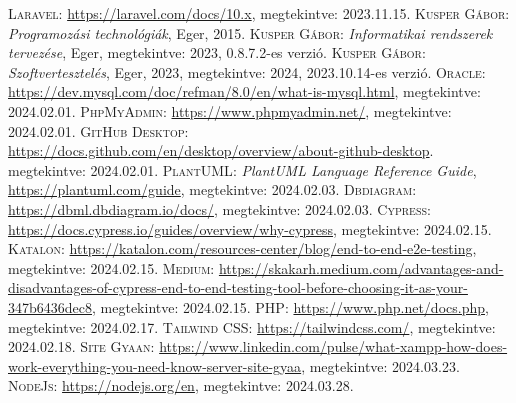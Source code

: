 \documentclass[]{thesis-ekf}
\theoremstyle{definition}
\theoremstyle{remark}
\begin{document}
	\begin{thebibliography}{2}
		\textsc{Laravel:} \url{https://laravel.com/docs/10.x},  megtekintve: 2023.11.15.
		\textsc{Kusper Gábor}: \emph{Programozási technológiák}, Eger, 2015.
		\textsc{Kusper Gábor}: \emph{Informatikai rendszerek tervezése}, Eger, megtekintve: 2023, 0.8.7.2-es verzió.
		\textsc{Kusper Gábor}: \emph{Szoftvertesztelés}, Eger, 2023, megtekintve: 2024, 2023.10.14-es verzió.
		\textsc{Oracle}: \url{https://dev.mysql.com/doc/refman/8.0/en/what-is-mysql.html}, megtekintve: 2024.02.01.
		\textsc{PhpMyAdmin}: \url{https://www.phpmyadmin.net/}, megtekintve: 2024.02.01.
		\textsc{GitHub Desktop}: \url{https://docs.github.com/en/desktop/overview/about-github-desktop}. megtekintve: 2024.02.01.
		\textsc{PlantUML}: \emph{PlantUML Language Reference Guide}, \url{https://plantuml.com/guide}, megtekintve: 2024.02.03.
		\textsc{Dbdiagram}: \url{https://dbml.dbdiagram.io/docs/},  megtekintve: 2024.02.03.
		\textsc{Cypress}: \url{https://docs.cypress.io/guides/overview/why-cypress},  megtekintve: 2024.02.15.
		\textsc{Katalon}: \url{https://katalon.com/resources-center/blog/end-to-end-e2e-testing},  megtekintve: 2024.02.15.
		\textsc{Medium}: \url{https://skakarh.medium.com/advantages-and-disadvantages-of-cypress-end-to-end-testing-tool-before-choosing-it-as-your-347b6436dec8}, megtekintve: 2024.02.15.
		\textsc{PHP}: \url{https://www.php.net/docs.php},  megtekintve: 2024.02.17.
		\textsc{Tailwind CSS}: \url{https://tailwindcss.com/}, megtekintve: 2024.02.18.
		\textsc{Site Gyaan}: \url{https://www.linkedin.com/pulse/what-xampp-how-does-work-everything-you-need-know-server-site-gyaa}, megtekintve: 2024.03.23.
		\textsc{NodeJs}: \url{https://nodejs.org/en}, megtekintve: 2024.03.28.
	\end{thebibliography}
	
	
\end{document}
